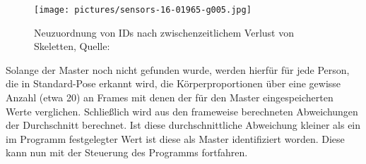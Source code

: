  \begin{figure}
\texttt{[image: pictures/sensors-16-01965-g005.jpg]}
\caption{Neuzuordnung von IDs nach zwischenzeitlichem \glqq Verlust\grqq{} von Skeletten, Quelle:\cite{bodyprop}}
\label{fig:fehlerk}
\end{figure}
 \par
 Solange der Master noch nicht gefunden wurde, werden hierfür für jede Person, die in Standard-Pose erkannt wird, die Körperproportionen über eine gewisse Anzahl (etwa 20) an Frames mit denen der für den Master eingespeicherten Werte verglichen. Schließlich wird aus den frameweise berechneten Abweichungen der Durchschnitt berechnet. Ist diese durchschnittliche Abweichung kleiner als ein im Programm festgelegter Wert ist diese als Master identifiziert worden. Diese kann nun mit der Steuerung des Programms fortfahren.
	
	